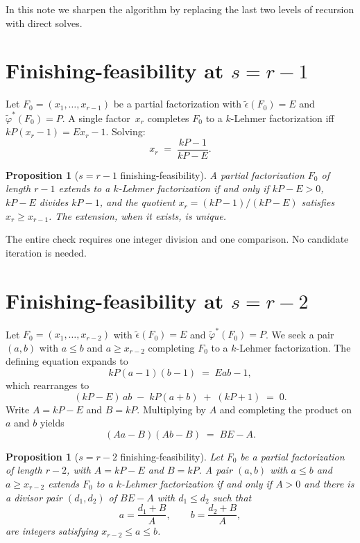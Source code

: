 \documentclass[11pt]{article}
\newtheorem{proposition}[theorem]{Proposition}
\theoremstyle{definition}
\theoremstyle{remark}
\newcommand{\eps}{\tilde{\epsilon}}
\newcommand{\phist}{\tilde{\varphi}^*}
\begin{document}
In this note we sharpen the algorithm by replacing the last two levels
of recursion with direct solves.

\section{Finishing-feasibility at $s = r - 1$}

Let $F_0 = (x_1, \ldots, x_{r-1})$ be a partial factorization with
$\eps(F_0) = E$ and $\phist(F_0) = P$.  A single factor~$x_r$ completes
$F_0$ to a $k$-Lehmer factorization iff
$k P (x_r - 1) = E x_r - 1$.  Solving:
\begin{equation}\label{eq:r-1-finish}
  x_r \;=\; \frac{kP - 1}{kP - E}.
\end{equation}

\begin{proposition}[$s = r - 1$ finishing-feasibility]\label{prop:rm1}
A partial factorization $F_0$ of length $r - 1$ extends to a $k$-Lehmer
factorization if and only if $kP - E > 0$, $kP - E$ divides $kP - 1$,
and the quotient $x_r = (kP - 1)/(kP - E)$ satisfies $x_r \ge x_{r-1}$.
The extension, when it exists, is unique.
\end{proposition}

The entire check requires one integer division and one comparison.  No
candidate iteration is needed.

\section{Finishing-feasibility at $s = r - 2$}

Let $F_0 = (x_1, \ldots, x_{r-2})$ with $\eps(F_0) = E$ and
$\phist(F_0) = P$.  We seek a pair $(a, b)$ with $a \le b$ and
$a \ge x_{r-2}$ completing $F_0$ to a $k$-Lehmer factorization.  The
defining equation expands to
\[
  kP(a - 1)(b - 1) \;=\; Eab - 1,
\]
which rearranges to
\[
  (kP - E)\,ab \;-\; kP(a + b) \;+\; (kP + 1) \;=\; 0.
\]
Write $A = kP - E$ and $B = kP$.  Multiplying by $A$ and completing the
product on $a$ and $b$ yields
\begin{equation}\label{eq:finish}
  (A a - B)(A b - B) \;=\; B E - A.
\end{equation}

\begin{proposition}[$s = r - 2$ finishing-feasibility]\label{prop:rm2}
Let $F_0$ be a partial factorization of length $r - 2$, with $A = kP - E$
and $B = kP$.  A pair $(a, b)$ with $a \le b$ and $a \ge x_{r-2}$ extends
$F_0$ to a $k$-Lehmer factorization if and only if $A > 0$ and there is
a divisor pair $(d_1, d_2)$ of $BE - A$ with $d_1 \le d_2$ such that
\[
  a = \frac{d_1 + B}{A},
  \qquad
  b = \frac{d_2 + B}{A},
\]
are integers satisfying $x_{r-2} \le a \le b$.
\end{proposition}
\end{document}

